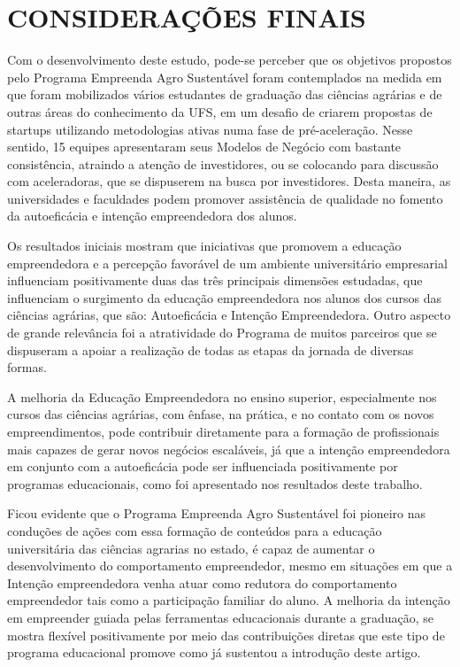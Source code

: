 \chapter{CONSIDERAÇÕES FINAIS}


Com o desenvolvimento deste estudo, pode-se perceber que os objetivos propostos pelo Programa Empreenda Agro Sustentável foram contemplados na medida em que foram mobilizados vários estudantes de graduação das ciências agrárias e de outras áreas do conhecimento da UFS, em um desafio de criarem propostas de startups utilizando metodologias ativas numa fase de pré-aceleração. Nesse sentido, 15 equipes apresentaram seus Modelos de Negócio com bastante consistência, atraindo a atenção de investidores, ou se colocando para discussão com aceleradoras, que se dispuserem na busca por investidores. Desta maneira, as universidades e faculdades podem promover assistência de qualidade no fomento da autoeficácia e intenção empreendedora dos alunos.

Os resultados iniciais mostram que iniciativas que promovem a educação empreendedora e a percepção favorável de um ambiente universitário empresarial influenciam positivamente duas das três principais dimensões estudadas, que influenciam o surgimento da educação empreendedora nos alunos dos cursos das ciências agrárias, que são: Autoeficácia e Intenção Empreendedora. Outro aspecto de grande relevância foi a atratividade do Programa de muitos parceiros que se dispuseram a apoiar a realização de todas as etapas da jornada de diversas formas.

A melhoria da Educação Empreendedora no ensino superior, especialmente nos cursos das ciências agrárias, com ênfase, na prática, e no contato com os novos empreendimentos, pode contribuir diretamente para a formação de profissionais mais capazes de gerar novos negócios escaláveis, já que a intenção empreendedora em conjunto com a autoeficácia pode ser influenciada positivamente por programas educacionais, como foi apresentado nos resultados deste trabalho.

Ficou evidente que o Programa Empreenda Agro Sustentável foi pioneiro nas conduções de ações com essa formação de conteúdos para a educação universitária das ciências agrarias no estado, é capaz de aumentar o desenvolvimento do comportamento empreendedor, mesmo em situações em que a Intenção empreendedora venha atuar como redutora do comportamento empreendedor tais como a participação familiar do aluno.
A melhoria da intenção em empreender guiada pelas ferramentas educacionais durante a graduação, se mostra flexível positivamente por meio das contribuições diretas que este tipo de programa educacional promove como já sustentou a introdução deste artigo.

